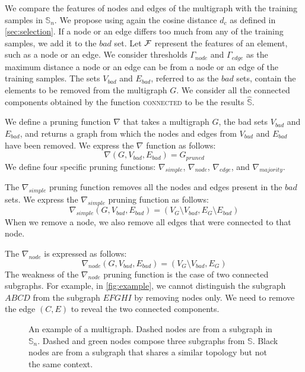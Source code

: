 \documentclass{llncs}
\begin{document}
We compare the features of nodes and edges of the multigraph with the training samples in \(\mathbb{S}_n\).
We propose using again the cosine distance \(d_c\) as defined in \autoref{sec:selection}.
If a node or an edge differs too much from any of the training samples, we add it to the \(bad\) set.
Let \({\cal{F}}\) represent the features of an element, such as a node or an edge.
We consider thresholds \(\Gamma_{node}\) and \(\Gamma_{edge}\) as the maximum distance a node or an edge can be from a node or an edge of the training samples.
The sets \(V_{bad}\) and \(E_{bad}\), referred to as the \(bad\) sets, contain the elements to be removed from the multigraph \(G\).
We consider all the connected components obtained by the function \textsc{connected} to be the results \(\hat{\mathbb{S}}\).

We define a pruning function \(\nabla\) that takes a multigraph \(G\), the bad sets \(V_{bad}\) and \(E_{bad}\), and returns a graph from which the nodes and edges from \(V_{bad}\) and \(E_{bad}\) have been removed.
We express the \(\nabla\) function as follows:
\begin{equation}
\nabla(G, V_{bad}, E_{bad}) = G_{pruned}
\end{equation}
We define four specific pruning functions: \(\nabla_{simple}\), \(\nabla_{node}\), \(\nabla_{edge}\), and \(\nabla_{majority}\).

The \(\nabla_{simple}\) pruning function removes all the nodes and edges present in the \(bad\) sets.
We express the \(\nabla_{simple}\) pruning function as follows:
\begin{equation}
\nabla_{simple}(G, V_{bad}, E_{bad}) = (V_G \setminus V_{bad}, E_G \setminus E_{bad})
\end{equation}
When we remove a node, we also remove all edges that were connected to that node.

The \(\nabla_{node}\) is expressed as follows:
\begin{equation}
\nabla_{node}(G, V_{bad}, E_{bad}) = (V_G \setminus V_{bad}, E_G)
\end{equation}
The weakness of the \(\nabla_{node}\) pruning function is the case of two connected subgraphs.
For example, in \autoref{fig:example}, we cannot distinguish the subgraph \(ABCD\) from the subgraph \(EFGHI\) by removing nodes only.
We need to remove the edge \((C, E)\) to reveal the two connected components.

\begin{figure}[htbp!]
\centering
\resizebox{0.75\linewidth}{!}{

}
\caption{
An example of a multigraph.
Dashed nodes are from a subgraph in \(\mathbb{S}_n\).
Dashed and green nodes compose three subgraphs from \(\mathbb{S}\).
Black nodes are from a subgraph that shares a similar topology but not the same context.
}%
\label{fig:example}
\end{figure}
\end{document}
